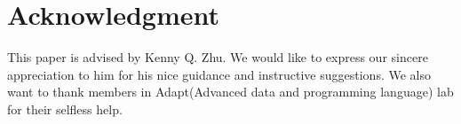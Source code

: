 \section{Acknowledgment}
This paper is advised by Kenny Q. Zhu. We would like to express our sincere appreciation to him for his nice guidance and instructive suggestions.
We also want to thank members in Adapt(Advanced data and programming language) lab for their selfless help.
